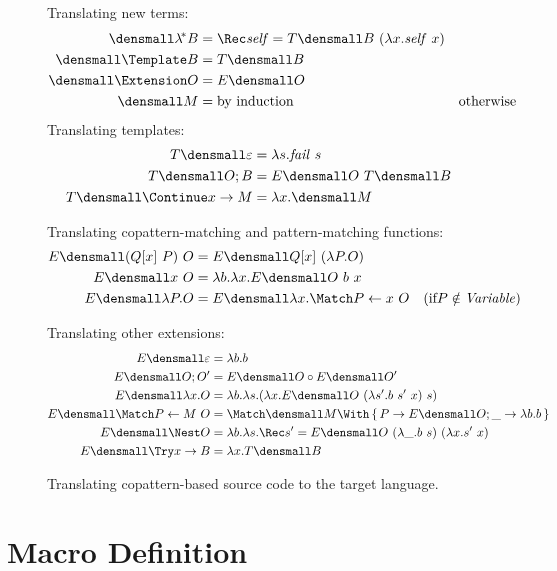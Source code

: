 \documentclass[runningheads]{llncs}
\begin{document}
\begin{figure}
\centering
Translating new terms:  
\begin{align*}
  \den{\lamstar B}
  &=
  \Rec \mathit{self} = T\den{B} ~ (\lambda x. \mathit{self} ~ x)
  \\
  \den{\Template B}
  &=
  T\den{B}
  \\
  \den{\Extension O}
  &=
  E\den{O}
  \\
  \den{M}
  &=
  \text{by induction}
  &\text{otherwise}
\end{align*}
Translating templates:
\begin{align*}
  T\den{\varepsilon}
  &=
  \lambda s. \mathit{fail}~s
  \\
  T\den{O; B}
  &=
  E\den{O} ~ T\den{B}
  \\
  T\den{\Continue x \to M}
  &=
  \lambda x. \den{M}
\end{align*}

Translating copattern-matching and pattern-matching functions:
\begin{align*}
  E\den{(Q[x] ~ P) ~ O}
  &=
  E\den{Q[x] ~ (\lambda P. O)}
  \\
  E\den{x ~ O}
  &=
  \lambda b. \lambda x. E\den{O} ~ b ~ x
  \\
  E\den{\lambda P. O}
  &=
  E\den{\lambda x. \Match P \gets x ~ O}
  &(\text{if} P \notin \mathit{Variable})
\end{align*}

Translating other extensions:
\begin{align*}
  E\den{\varepsilon}
  &=
  \lambda b. b
  \\
  E\den{O; O'}
  &=
  E\den{O} \comp E\den{O'}
  \\
  E\den{\lambda x. O}
  &=
  \lambda b. \lambda s. (\lambda x. E\den{O} ~ (\lambda s'. b ~ s' ~ x) ~ s)
  \\
  E\den{\Match P \gets M ~ O}
  &=
  \Match \den{M} \With \set{P \to E\den{O}; \_ \to \lambda b. b}
  \\
  E\den{\Nest O}
  &=
  \lambda b. \lambda s. \Rec s' = E\den{O} ~ (\lambda \_. b ~ s) ~ (\lambda x. s' ~ x)
  \\
  E\den{\Try x \to B}
  &=
  \lambda x. T\den{B}
\end{align*}
\caption{Translating copattern-based source code to the target language.}
\label{fig:translation}
\end{figure}


\section{Macro Definition}
\end{document}

